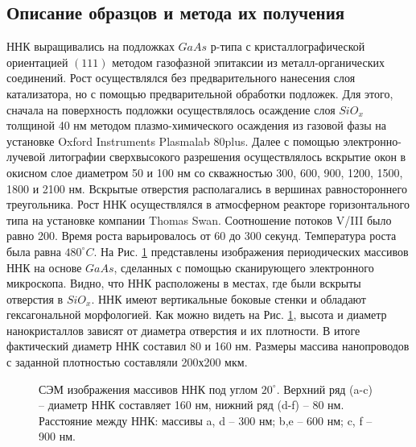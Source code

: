 \documentclass[a4paper,14pt,russian]{extreport}
\begin{document}
			\subsection{Описание образцов и метода их получения}
				ННК выращивались на подложках $GaAs$ р-типа с кристаллографической ориентацией $(111)$ методом газофазной эпитаксии из металл-органических соединений. Рост осуществлялся без предварительного нанесения слоя катализатора, но с помощью предварительной обработки подложек. Для этого, сначала на поверхность подложки осуществлялось осаждение слоя $SiO_x$ толщиной 40 нм методом плазмо-химического осаждения из газовой фазы на установке Oxford Instruments Plasmalab 80plus. Далее с помощью электронно-лучевой литографии сверхвысокого разрешения осуществлялось вскрытие окон в окисном слое диаметром 50 и 100 нм со скважностью 300, 600, 900, 1200, 1500, 1800 и 2100 нм. Вскрытые отверстия располагались в вершинах равностороннего треугольника. Рост ННК осуществлялся в атмосферном реакторе горизонтального типа на установке компании Thomas Swan. Соотношение потоков V/III было равно 200. Время роста варьировалось от 60 до 300 секунд. Температура роста была равна $480^\circ C$. На Рис. \ref{ris:OrderedSamples} представлены изображения периодических массивов ННК на основе $GaAs$, сделанных с помощью сканирующего электронного микроскопа. Видно, что ННК расположены в местах, где были вскрыты отверстия в $SiO_x$. ННК имеют вертикальные боковые стенки и обладают гексагональной морфологией. Как можно видеть на Рис. \ref{ris:OrderedSamples}, высота и диаметр нанокристаллов зависят от диаметра отверстия и их плотности. В итоге фактический диаметр ННК составил 80 и 160 нм. Размеры массива нанопроводов с заданной плотностью составляли 200х200 мкм.
				\begin{figure}[H]
					\caption{СЭМ изображения массивов ННК под углом $20^\circ$. Верхний ряд (a-c) – диаметр ННК составляет 160 нм, нижний ряд (d-f) – 80 нм. Расстояние между ННК: массивы a, d – 300 нм; b,e – 600 нм; c, f – 900 нм.}
				\label{ris:OrderedSamples}
				\end{figure}
\end{document}
